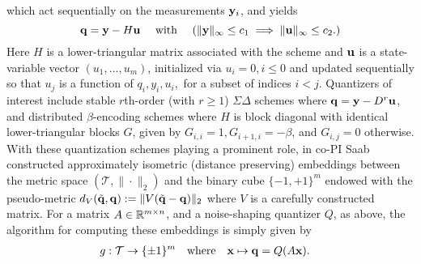 \fi 
which act sequentially on the measurements $\mathbf{y}_i$, %
%
%
and yields
$$ \mathbf{q}=\mathbf{y} - H\mathbf{u} \quad \text{ with }  \quad(\|\mathbf{y}\|_\infty \leq c_1 \implies \|\mathbf{u}\|_\infty \leq c_2.) $$ Here $H$ is a lower-triangular matrix associated with the scheme and $\mathbf{u}$ is a state-variable vector $(u_1,...,u_m)$, initialized via $u_i=0, i\leq 0$ and updated sequentially so that $u_j$ is a function of $q_i, y_i, u_i,$ for a subset of indices $i < j$. Quantizers of interest include
stable $r$th-order (with $r\geq 1$) $\Sigma\Delta$ schemes  \cite{daubechies2003approximating} where  $\mathbf{q}= \mathbf{y} - D^r \mathbf{u}$, and distributed $\beta$-encoding schemes \cite{chou2016distributed} where $H$ is block diagonal with identical lower-triangular blocks $G$, given by $G_{i,i}=1, G_{i+1,i}=-\beta$, and $G_{i,j}=0$ otherwise.
With these quantization schemes playing a prominent role, in  \cite{huynh2018fast} co-PI Saab  constructed approximately isometric (distance preserving) embeddings between the metric space  $(\mathcal{T}, \|\cdot\|_2)$ and the binary  cube $\{-1,+1\}^m$ endowed with the pseudo-metric
$d_{{V}}(\tilde{\mathbf{q}},\mathbf{q}) := \| {V}(\tilde{\mathbf{q}} -{\mathbf{q}}) \|_2$
where $V$ is a carefully constructed matrix.
For a  matrix $A\in\mathbb{R}^{m\times n}$, and a noise-shaping quantizer $Q$, as above, the algorithm for computing these embeddings is simply given by \begin{align}
g: \mathcal{T} &\to \{\pm 1\}^m\nonumber\quad \text{where} \quad
\mathbf{x} \mapsto \mathbf{q}=Q(A\mathbf{x}).\nonumber
\end{align}

